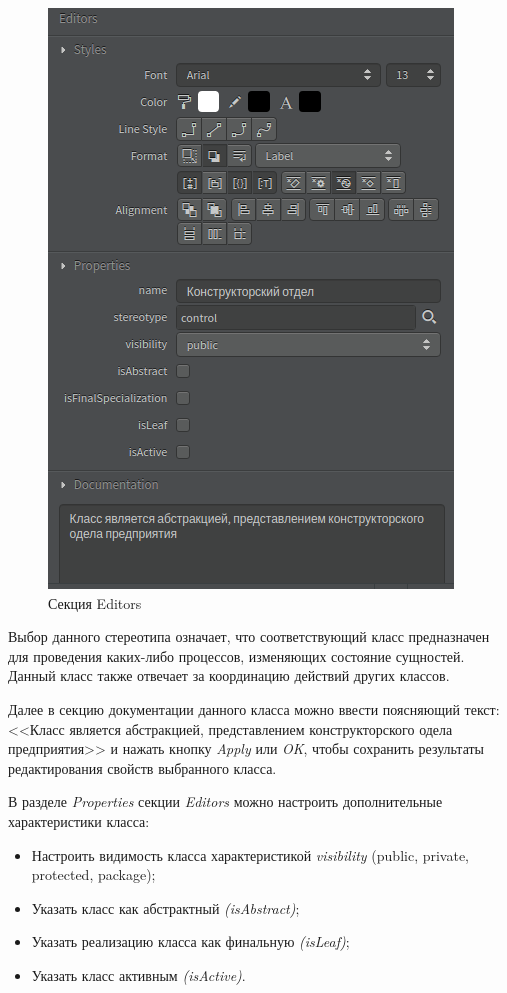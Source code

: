 \documentclass[a4paper,12pt]{extreport}
\begin{document}
\begin{figure}[h!]
	\centering
	\includegraphics[width=0.4\linewidth]{images/classeditors}
	\caption{Секция Editors}
	\label{fig:classeditors}
\end{figure}



Выбор данного стереотипа означает, что соответствующий класс предназначен для проведения каких-либо процессов, изменяющих состояние сущностей. Данный класс также отвечает за координацию действий других классов.

Далее в секцию документации данного класса можно ввести поясняющий текст: <<Класс является абстракцией, представлением конструкторского одела предприятия>> и нажать кнопку \textit{Apply} или \textit{OK}, чтобы сохранить результаты редактирования свойств выбранного класса.



В разделе \textit{Properties} секции \textit{Editors} можно настроить дополнительные характеристики класса:
\begin{itemize}
	\item Настроить видимость класса характеристикой \textit{visibility} (public, private, protected, package);
	\item Указать класс как абстрактный \textit{(isAbstract)};
	\item Указать реализацию класса как финальную \textit{(isLeaf)};
	\item Указать класс активным \textit{(isActive)}.
\end{itemize}
\end{document}

